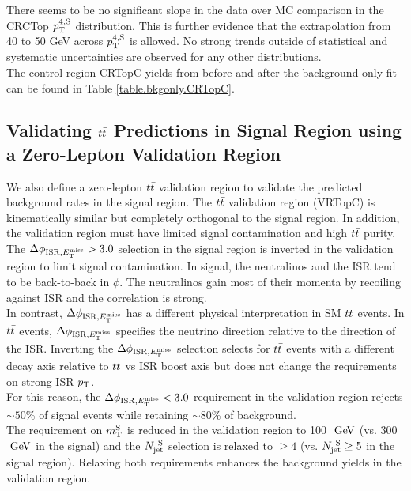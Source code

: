 \indent There seems to be no significant slope in the data over MC comparison in the CRCTop $p_{\mathrm{T}}^{4,\mathrm{S}}$ distribution.  This is further evidence that the extrapolation from 40 to 50 GeV across $p_{\mathrm{T}}^{4,\mathrm{S}}$ is allowed.  No strong trends outside of statistical and systematic uncertainties are observed for any other distributions. \\

\indent The control region CRTopC yields from before and after the background-only fit can be found in Table \ref{table.bkgonly.CRTopC}.\\



\subsection{Validating $t\bar{t}$ Predictions in Signal Region using a Zero-Lepton Validation Region}
\label{sec:Bkg:ttbar:VR}

\indent We also define a zero-lepton $t\bar{t}$ validation region to validate the predicted background rates in the signal region.  The $t\bar{t}$ validation region (VRTopC) is kinematically similar but completely orthogonal to the signal region.  In addition, the validation region must have limited signal contamination and high $t\bar{t}$ purity. \\

\indent The $\Delta\phi_{\mathrm{ISR},E_{\mathrm{T}}^{\mathrm{miss}}} > 3.0$ selection in the signal region is inverted in the validation region to limit signal contamination. In signal, the neutralinos and the ISR tend to be back-to-back in $\phi$.  The neutralinos gain most of their momenta by recoiling against ISR and the correlation is strong. \\

\indent In contrast, $\Delta\phi_{\mathrm{ISR},E_{\mathrm{T}}^{\mathrm{miss}}}$ has a different physical interpretation in SM $t\bar{t}$ events.   In $t\bar{t}$ events, $\Delta\phi_{\mathrm{ISR},E_{\mathrm{T}}^{\mathrm{miss}}}$ specifies the neutrino direction relative to the direction of the ISR.  Inverting the $\Delta\phi_{\mathrm{ISR},E_{\mathrm{T}}^{\mathrm{miss}}}$ selection selects for $t\bar{t}$ events with a different decay axis relative to $t\bar{t}$ vs ISR boost axis but does not change the requirements on strong ISR $p_{\mathrm{T}}$.  \\

\indent For this reason, the $\Delta\phi_{\mathrm{ISR},E_{\mathrm{T}}^{\mathrm{miss}}} < 3.0$ requirement in the validation region rejects $\sim50$\% of signal events while retaining $\sim80$\% of background. \\

\indent The requirement on $m_{\mathrm{T}}^{\mathrm{S}}$ is reduced in the validation region to 100 $\GeV$ (vs. 300 $\GeV$ in the signal) and the $N_{\mathrm{jet}}^{~\mathrm{S}}$ selection is relaxed to $\ge 4$ (vs. $N_{\mathrm{jet}}^{~\mathrm{S}} \ge 5$ in the signal region).  Relaxing both requirements enhances the background yields in the validation region. \\

